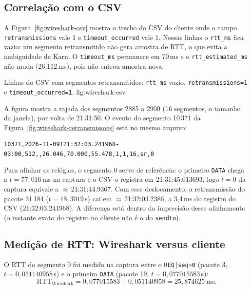 \subsection{Correlação com o CSV}

A Figura~\ref{fig:wireshark-csv} mostra o trecho do CSV do cliente onde o
campo \texttt{retransmissions} vale 1 e \texttt{timeout\_occurred} vale 1.
Nessas linhas o \texttt{rtt\_ms} fica vazio: um segmento retransmitido não
gera amostra de RTT, o que evita a ambiguidade de Karn. O
\texttt{timeout\_ms} permanece em 70\,ms e o \texttt{rtt\_estimated\_ms} não
muda (26,112\,ms), pois não entrou amostra nova.

  {Linhas do CSV com segmentos retransmitidos: \texttt{rtt\_ms} vazio,
   \texttt{retransmissions=1} e \texttt{timeout\_occurred=1}.}
  {fig:wireshark-csv}

A figura mostra a rajada dos segmentos 2885 a 2900 (16 segmentos, o tamanho
da janela), por volta de 21:31:50. O evento do segmento 10\,371 da
Figura~\ref{fig:wireshark-retransmissoes} está no mesmo arquivo:
\begin{center}
\small
\texttt{10371,2026-11-09T21:32:03.241968-03:00,512,,26.046,70.000,55.478,1,1,16,sr,0}
\end{center}
Para alinhar os relógios, o segmento 0 serve de referência: o primeiro
\texttt{DATA} chega a $t=77{,}016$\,ms na captura e o CSV o registra em
21:31:45.013693, logo $t=0$ da captura equivale a
$\approx$\,21:31:44.9367. Com esse deslocamento, a retransmissão do
pacote 31\,184 ($t=18{,}3019$\,s) cai em $\approx$\,21:32:03.2386, a
3,4\,ms do registro do CSV (21:32:03.241968). A diferença está dentro da
imprecisão desse alinhamento (o instante exato do registro no cliente não é o
do \texttt{sendto}).

\subsection{Medição de RTT: Wireshark versus cliente}

O RTT do segmento 0 foi medido na captura entre o \texttt{REQ|seq=0}
(pacote 3, $t=0{,}051140958$\,s) e o primeiro \texttt{DATA} (pacote 19,
$t=0{,}077015583$\,s):
\[
  \text{RTT}_{\text{Wireshark}} = 0{,}077015583 - 0{,}051140958
  = 25{,}874625\ \text{ms}.
\]

